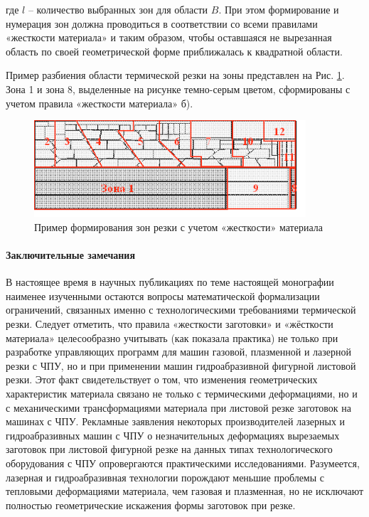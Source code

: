 \documentclass{article}
\begin{document}
где $l$
– количество выбранных зон для области $B$.
При этом формирование и нумерация зон
должна проводиться в соответствии со всеми правилами
«жесткости материала» и таким образом,
чтобы оставшаяся не вырезанная область
по своей геометрической форме приближалась к квадратной области.

Пример разбиения области термической резки на зоны
представлен на
Рис. \ref{zones}.
Зона 1 и зона 8,
выделенные на рисунке темно-серым цветом,
сформированы с учетом правила «жесткости материала» б).

\begin{figure}
  \begin{center}
  \includegraphics[width=0.9\textwidth]{zones.png}
  \caption{Пример формирования зон резки с учетом «жесткости» материала}
  \label{zones}
  \end{center}
\end{figure}

\paragraph{Заключительные замечания}

В настоящее время в научных публикациях по теме настоящей монографии
наименее изученными остаются вопросы математической формализации ограничений,
связанных именно с технологическими требованиями термической резки.
Следует отметить, что правила «жесткости заготовки» и «жёсткости материала»
целесообразно учитывать (как показала практика)
не только при разработке управляющих программ для машин газовой,
плазменной и лазерной резки с ЧПУ,
но и при применении машин гидроабразивной фигурной листовой резки.
Этот факт свидетельствует о том,
что изменения геометрических характеристик материала
связано не только с термическими деформациями,
но и с механическими трансформациями материала
при листовой резке заготовок на машинах с ЧПУ.
Рекламные заявления некоторых производителей
лазерных и гидроабразивных машин с ЧПУ о незначительных
деформациях вырезаемых заготовок при листовой фигурной
резке на данных типах технологического оборудования с ЧПУ
опровергаются практическими исследованиями.
Разумеется, лазерная и гидроабразивная технологии
порождают меньшие проблемы с тепловыми деформациями материала,
чем газовая и плазменная,
но не исключают полностью геометрические искажения формы заготовок при резке.
\end{document}
